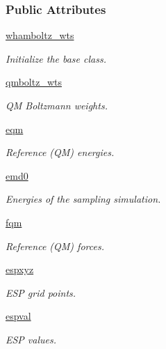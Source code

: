 \subsubsection*{Public Attributes}
\begin{DoxyCompactItemize}
\item 
\hyperlink{classforcebalance_1_1abinitio_1_1AbInitio_a885e7ef58b9e7c6abbc24321e5f3c61a}{whamboltz\-\_\-wts}
\begin{DoxyCompactList}\small\item\em Initialize the base class. \end{DoxyCompactList}\item 
\hyperlink{classforcebalance_1_1abinitio_1_1AbInitio_a06ec6b12d81791ca94f599f41e56335a}{qmboltz\-\_\-wts}
\begin{DoxyCompactList}\small\item\em Q\-M Boltzmann weights. \end{DoxyCompactList}\item 
\hyperlink{classforcebalance_1_1abinitio_1_1AbInitio_a64387fae9bdfb0d03ca6961e67c779be}{eqm}
\begin{DoxyCompactList}\small\item\em Reference (Q\-M) energies. \end{DoxyCompactList}\item 
\hyperlink{classforcebalance_1_1abinitio_1_1AbInitio_af928d333d14cb3b93f7db78530455873}{emd0}
\begin{DoxyCompactList}\small\item\em Energies of the sampling simulation. \end{DoxyCompactList}\item 
\hyperlink{classforcebalance_1_1abinitio_1_1AbInitio_af025be2ce97da3e8dc876d70e403f4ef}{fqm}
\begin{DoxyCompactList}\small\item\em Reference (Q\-M) forces. \end{DoxyCompactList}\item 
\hyperlink{classforcebalance_1_1abinitio_1_1AbInitio_a8be2d088afb344036aae989ca3cbcc41}{espxyz}
\begin{DoxyCompactList}\small\item\em E\-S\-P grid points. \end{DoxyCompactList}\item 
\hyperlink{classforcebalance_1_1abinitio_1_1AbInitio_aba6d885086d455fce8c3d472fd08020d}{espval}
\begin{DoxyCompactList}\small\item\em E\-S\-P values. \end{DoxyCompactList}\item 

\end{DoxyCompactItemize}
